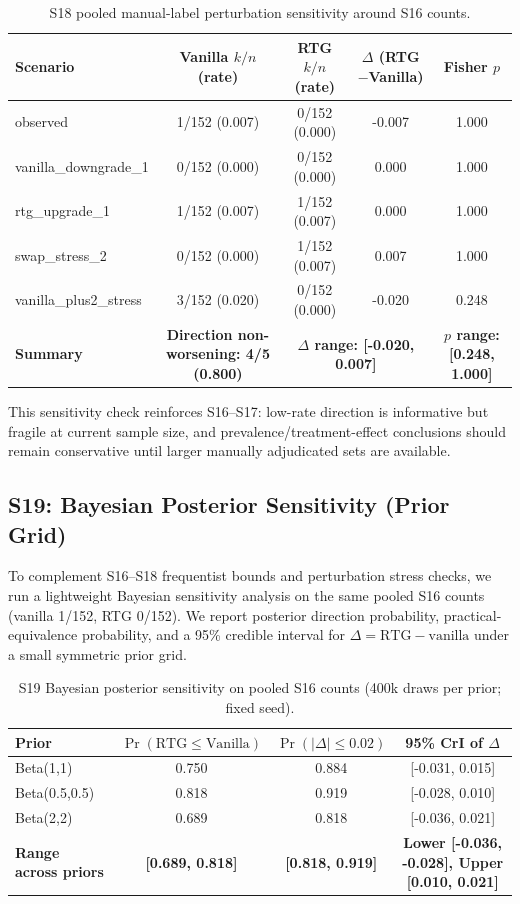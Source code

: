 \begin{table}[t]
\centering
\scriptsize
\caption{S18 pooled manual-label perturbation sensitivity around S16 counts.}
\begin{tabular}{lcccc}
\toprule
\textbf{Scenario} & \textbf{Vanilla $k/n$ (rate)} & \textbf{RTG $k/n$ (rate)} & \textbf{$\Delta$ (RTG$-$Vanilla)} & \textbf{Fisher $p$} \\
\midrule
observed & 1/152 (0.007) & 0/152 (0.000) & -0.007 & 1.000 \\
vanilla\_downgrade\_1 & 0/152 (0.000) & 0/152 (0.000) & 0.000 & 1.000 \\
rtg\_upgrade\_1 & 1/152 (0.007) & 1/152 (0.007) & 0.000 & 1.000 \\
swap\_stress\_2 & 0/152 (0.000) & 1/152 (0.007) & 0.007 & 1.000 \\
vanilla\_plus2\_stress & 3/152 (0.020) & 0/152 (0.000) & -0.020 & 0.248 \\
\midrule
\textbf{Summary} & \textbf{Direction non-worsening: 4/5 (0.800)} & \multicolumn{2}{c}{\textbf{$\Delta$ range: [-0.020, 0.007]}} & \textbf{$p$ range: [0.248, 1.000]} \\
\bottomrule
\end{tabular}
\label{tab:supp_e18_sensitivity}
\end{table}

This sensitivity check reinforces S16--S17: low-rate direction is informative but fragile at current sample size, and prevalence/treatment-effect conclusions should remain conservative until larger manually adjudicated sets are available.

\subsection{S19: Bayesian Posterior Sensitivity (Prior Grid)}

To complement S16--S18 frequentist bounds and perturbation stress checks, we run a lightweight Bayesian sensitivity analysis on the same pooled S16 counts (vanilla 1/152, RTG 0/152). We report posterior direction probability, practical-equivalence probability, and a 95\% credible interval for $\Delta=\text{RTG}-\text{vanilla}$ under a small symmetric prior grid.

\begin{table}[t]
\centering
\scriptsize
\caption{S19 Bayesian posterior sensitivity on pooled S16 counts (400k draws per prior; fixed seed).}
\begin{tabular}{lccc}
\toprule
\textbf{Prior} & \textbf{$\Pr(\text{RTG}\le\text{Vanilla})$} & \textbf{$\Pr(|\Delta|\le0.02)$} & \textbf{95\% CrI of $\Delta$} \\
\midrule
Beta(1,1) & 0.750 & 0.884 & [-0.031, 0.015] \\
Beta(0.5,0.5) & 0.818 & 0.919 & [-0.028, 0.010] \\
Beta(2,2) & 0.689 & 0.818 & [-0.036, 0.021] \\
\midrule
\textbf{Range across priors} & \textbf{[0.689, 0.818]} & \textbf{[0.818, 0.919]} & \textbf{Lower [-0.036, -0.028], Upper [0.010, 0.021]} \\
\bottomrule
\end{tabular}
\label{tab:supp_e19_bayes}
\end{table}


